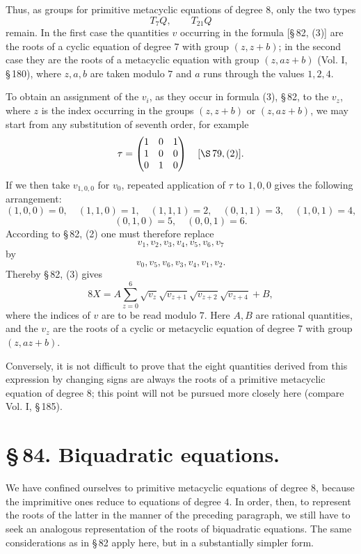 \documentclass[11pt]{article}
\providecommand{\mmat}[9]{\begin{pmatrix}#1&#2&#3\\#4&#5&#6\\#7&#8&#9\end{pmatrix}}
\providecommand{\mmat}[9]{\begin{pmatrix}#1&#2&#3\\#4&#5&#6\\#7&#8&#9\end{pmatrix}}
\begin{document}
Thus, as groups for primitive metacyclic equations of degree $8$, only the two types
\[
 T_7Q,
 \qquad T_{21}Q
\]
remain. In the first case the quantities $v$ occurring in the formula [\S\,82, (3)] are the roots of a cyclic equation of degree $7$ with group $(z,z+b)$; in the second case they are the roots of a metacyclic equation with group $(z,az+b)$ (Vol. I, \S\,180), where $z,a,b$ are taken modulo $7$ and $a$ runs through the values $1,2,4$.

To obtain an assignment of the $v_i$, as they occur in formula (3), \S\,82, to the $v_z$, where $z$ is the index occurring in the groups $(z,z+b)$ or $(z,az+b)$, we may start from any substitution of seventh order, for example
\[
 \tau=\mmat{1}{0}{1}{1}{0}{0}{0}{1}{0}\quad [\S\,79,(2)].
\]
If we then take $v_{1,0,0}$ for $v_0$, repeated application of $\tau$ to $1,0,0$ gives the following arrangement:
\[
 (1,0,0)=0,
 \quad (1,1,0)=1,
 \quad (1,1,1)=2,
 \quad (0,1,1)=3,
 \quad (1,0,1)=4,
\]
\[
 (0,1,0)=5,
 \quad (0,0,1)=6.
\]
According to \S\,82, (2) one must therefore replace
\[
 v_1,v_2,v_3,v_4,v_5,v_6,v_7
\]
by
\[
 v_0,v_5,v_6,v_3,v_4,v_1,v_2.
\]
Thereby \S\,82, (3) gives
\begin{equation}
 8X=A\sum_{z=0}^{6}\sqrt{v_z}\sqrt{v_{z+1}}\sqrt{v_{z+2}}\sqrt{v_{z+4}}+B,
 \tag{5}
\end{equation}
where the indices of $v$ are to be read modulo $7$. Here $A,B$ are rational quantities, and the $v_z$ are the roots of a cyclic or metacyclic equation of degree $7$ with group $(z,az+b)$.

Conversely, it is not difficult to prove that the eight quantities derived from this expression by changing signs are always the roots of a primitive metacyclic equation of degree $8$; this point will not be pursued more closely here (compare Vol. I, \S\,185).

\section*{\S\,84. Biquadratic equations.}

We have confined ourselves to primitive metacyclic equations of degree $8$, because the imprimitive ones reduce to equations of degree $4$. In order, then, to represent the roots of the latter in the manner of the preceding paragraph, we still have to seek an analogous representation of the roots of biquadratic equations. The same considerations as in \S\,82 apply here, but in a substantially simpler form.
\end{document}
